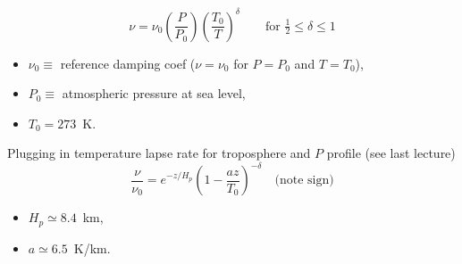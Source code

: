 \documentclass[11pt, oneside]{article}
\begin{document}
\begin{itemize}
\begin{itemize}
\begin{itemize}
\begin{equation}
				\nu = \nu_0\left(\frac{P}{P_0}\right)\left(\frac{T_0}{T}\right)^\delta \qquad \text{for } \tfrac{1}{2} \le \delta \le 1
			\end{equation}
			\begin{itemize}
				\item[] $\nu_0 \equiv$ reference damping coef ($\nu = \nu_0$ for $P = P_0$ and $T = T_0$),
				\item[] $P_0 \equiv$ atmospheric pressure at sea level,
				\item[] $T_0 = 273$~K.
			\end{itemize}
			Plugging in temperature lapse rate for troposphere and $P$ profile (see last lecture)
			\begin{equation}
				\label{e:nuz}
				\frac{\nu}{\nu_0} = e^{-z/H_p}\left(1 - \frac{az}{T_0}\right)^{-\delta} \quad \text{(note sign)}
			\end{equation}
			\begin{itemize}
				\item[] $H_p \simeq 8.4$~km,
				\item[] $a \simeq 6.5$~K/km.
			\end{itemize}

\end{itemize}
\end{itemize}
\end{itemize}
\end{document}
